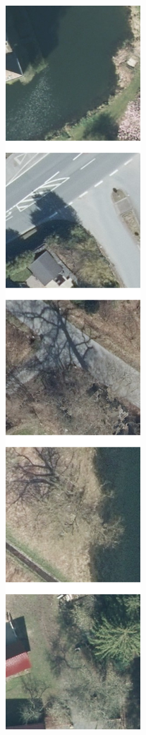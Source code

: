 \begin{figure}[h]
    \newcommand{\DensenetPredictionsImageWidth}{0.13\textwidth}
    \centering

    \begin{subfigure}{\DensenetPredictionsImageWidth}
        \includegraphics[width=\textwidth]{images/densenet/originals}

\end{subfigure}
\end{figure}
